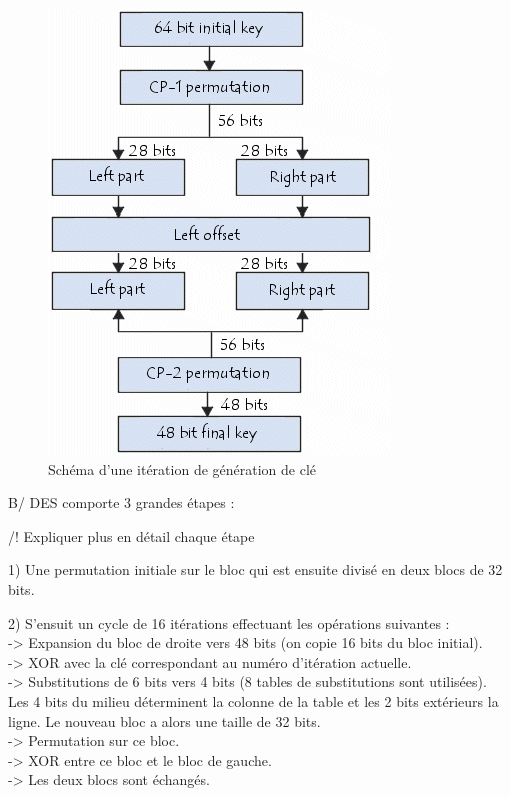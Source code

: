 \documentclass[a4paper,12pt]{article}
\begin{document}
\begin{figure}[h]
\centering
\includegraphics[scale=0.80]{./images/keygen.png}
\caption{Schéma d'une itération de génération de clé}
\label{fig:keygen}
\end{figure}

\clearpage

B/ DES comporte 3 grandes étapes :

/! Expliquer plus en détail chaque étape

1)  Une permutation initiale sur le bloc qui est ensuite divisé en deux blocs de 32 bits.

2) S'ensuit un cycle de 16 itérations effectuant les opérations suivantes : \\
-> Expansion du bloc de droite vers 48 bits (on copie 16 bits du bloc initial). \\
-> XOR avec la clé correspondant au numéro d'itération actuelle. \\
-> Substitutions de 6 bits vers 4 bits (8 tables de substitutions sont utilisées). Les 4 bits du milieu déterminent la colonne de la table et les 2 bits extérieurs la ligne. Le nouveau bloc a alors une taille de 32 bits. \\
-> Permutation sur ce bloc. \\
-> XOR entre ce bloc et le bloc de gauche. \\
-> Les deux blocs sont échangés. \\
\end{document}
